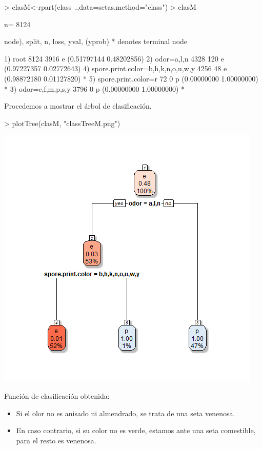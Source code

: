 \documentclass [a4paper] {article}
\begin{document}
\bigskip
\begin{Schunk}
\begin{Sinput}
> clasM<-rpart(class~.,data=setas,method="class")
> clasM
\end{Sinput}
\begin{Soutput}
n= 8124 

node), split, n, loss, yval, (yprob)
      * denotes terminal node

1) root 8124 3916 e (0.51797144 0.48202856)  
  2) odor=a,l,n 4328  120 e (0.97227357 0.02772643)  
    4) spore.print.color=b,h,k,n,o,u,w,y 4256   48 e (0.98872180 0.01127820) *
    5) spore.print.color=r 72    0 p (0.00000000 1.00000000) *
  3) odor=c,f,m,p,s,y 3796    0 p (0.00000000 1.00000000) *
\end{Soutput}
\end{Schunk}

\bigskip
Procedemos a mostrar el árbol de clasificación.
\begin{Schunk}
\begin{Sinput}
> plotTree(clasM, "classTreeM.png")
\end{Sinput}
\end{Schunk}
\includegraphics[width=\textwidth]{classTreeM}

\bigskip
Función de clasificación obtenida:
\begin{itemize}
\item Si el olor no es anisado ni almendrado, se trata de una seta venenosa.
\item En caso contrario, si su color no es verde, estamos ante una seta comestible, para el resto es venenosa.
\end{itemize}
\end{document}
